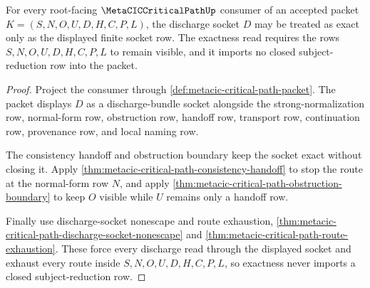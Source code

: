 \begin{theorem}
\label{thm:metacic-critical-path-root-discharge-exactness}
For every root-facing $\MetaCICCriticalPathUp$ consumer of an accepted packet $K=(S,N,O,U,D,H,C,P,L)$, the discharge socket $D$ may be treated as exact only as the displayed finite socket row. The exactness read requires the rows $S,N,O,U,D,H,C,P,L$ to remain visible, and it imports no closed subject-reduction row into the packet.
\end{theorem}
\begin{proof}
Project the consumer through \autoref{def:metacic-critical-path-packet}. The packet displays $D$ as a discharge-bundle socket alongside the strong-normalization row, normal-form row, obstruction row, handoff row, transport row, continuation row, provenance row, and local naming row.

The consistency handoff and obstruction boundary keep the socket exact without closing it. Apply \autoref{thm:metacic-critical-path-consistency-handoff} to stop the route at the normal-form row $N$, and apply \autoref{thm:metacic-critical-path-obstruction-boundary} to keep $O$ visible while $U$ remains only a handoff row.

Finally use discharge-socket nonescape and route exhaustion, \autoref{thm:metacic-critical-path-discharge-socket-nonescape} and \autoref{thm:metacic-critical-path-route-exhaustion}. These force every discharge read through the displayed socket and exhaust every route inside $S,N,O,U,D,H,C,P,L$, so exactness never imports a closed subject-reduction row.
\end{proof}

